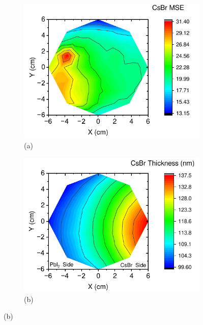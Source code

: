 \begin{figure}[htbp]
    \centering
    \begin{subfigure}[t]{0.49\textwidth}
        \centering
        \includegraphics[width=\textwidth]{chapters/stability/imeges/CsBrMSE.pdf} %
        \caption*{(a)}
    \end{subfigure}
    \hfill
    \begin{subfigure}[t]{0.49\textwidth}
        \centering
        \includegraphics[width=\textwidth]{chapters/stability/imeges/CsBrThickness.pdf} %
        \caption*{(b)}
    \end{subfigure}



\end{figure}
